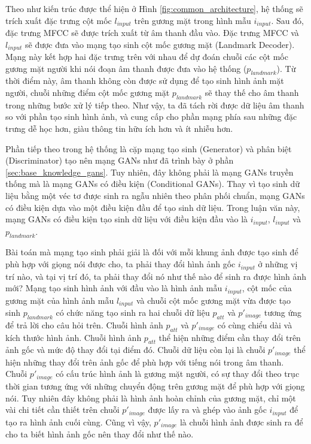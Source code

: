 Theo như kiến trúc được thể hiện ở Hình \ref{fig:common_architecture}, hệ thống sẽ trích xuất đặc trưng cột mốc $l_{input}$ trên gương mặt trong hình mẫu $i_{input}$. Sau đó, đặc trưng MFCC sẽ được trích xuất từ âm thanh đầu vào. Đặc trưng MFCC và $l_{input}$ sẽ được đưa vào mạng tạo sinh cột mốc gương mặt (Landmark Decoder). Mạng này kết hợp hai đặc trưng trên với nhau để dự đoán chuỗi các cột mốc gương mặt người khi nói đoạn âm thanh được đưa vào hệ thống ($p_{landmark}$). Từ thời điểm này, âm thanh không còn được sử dụng để tạo sinh hình ảnh mặt người, chuỗi những điểm cột mốc gương mặt $p_{landmark}$ sẽ thay thế cho âm thanh trong những bước xử lý tiếp theo. Như vậy, ta đã tách rời được dữ liệu âm thanh so với phần tạo sinh hình ảnh, và cung cấp cho phần mạng phía sau những đặc trưng dễ học hơn, giàu thông tin hữu ích hơn và ít nhiễu hơn. 

Phần tiếp theo trong hệ thống là cặp mạng tạo sinh (Generator) và phân biệt (Discriminator) tạo nên mạng GANs như đã trình bày ở phần \ref{sec:base_knowledge_gans}. Tuy nhiên, đây không phải là mạng GANs truyền thống mà là mạng GANs có điều kiện (Conditional GANs). Thay vì tạo sinh dữ liệu bằng một véc tơ được sinh ra ngẫu nhiên theo phân phối chuẩn, mạng GANs có điều kiện dựa vào một điều kiện đầu để tạo sinh dữ liệu. Trong luận văn này, mạng GANs có điều kiện tạo sinh dữ liệu với điều kiện đầu vào là $i_{input}$, $l_{input}$ và $p_{landmark}$.

Bài toán mà mạng tạo sinh phải giải là đối với mỗi khung ảnh được tạo sinh để phù hợp với giọng nói được cho, ta phải thay đổi hình ảnh gốc $i_{input}$ ở những vị trí nào, và tại vị trí đó, ta phải thay đổi nó như thế nào để sinh ra được hình ảnh mới? Mạng tạo sinh hình ảnh với đầu vào là hình ảnh mẫu $i_{input}$, cột mốc của gương mặt của hình ảnh mẫu $l_{input}$ và chuỗi cột mốc gương mặt vừa được tạo sinh $p_{landmark}$ có chức năng tạo sinh ra hai chuỗi dữ liệu $p_{att}$ và $p'_{image}$ tương ứng để trả lời cho câu hỏi trên. Chuỗi hình ảnh $p_{att}$ và $p'_{image}$ có cùng chiểu dài và kích thước hình ảnh. Chuỗi hình ảnh $p_{att}$ thể hiện những điểm cần thay đổi trên ảnh gốc và mức độ thay đổi tại điểm đó. Chuỗi dữ liệu còn lại là chuỗi $p'_{image}$ thể hiện những thay đổi trên ảnh gốc để phù hợp với tiếng nói trong âm thanh. Chuỗi $p'_{image}$ có cấu trúc hình ảnh là gương mặt người, có sự thay đổi theo trục thời gian tương ứng với những chuyển động trên gương mặt để phù hợp với giọng nói. Tuy nhiên đây không phải là hình ảnh hoàn chỉnh của gương mặt, chỉ một vài chi tiết cần thiết trên chuỗi $p'_{image}$ được lấy ra và ghép vào ảnh gốc $i_{input}$ để tạo ra hình ảnh cuối cùng. Cũng vì vậy, $p'_{image}$ là chuỗi hình ảnh được sinh ra để cho ta biết hình ảnh gốc nên thay đổi như thế nào. 

